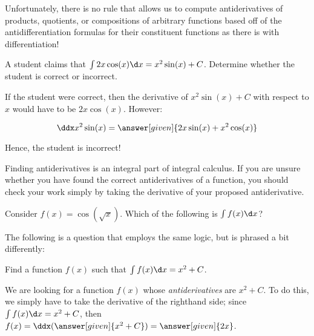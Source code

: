 \documentclass[nooutcomes]{ximera}
\begin{document}


Unfortunately, there is no rule that allows us to compute antiderivatives of products, quotients, or compositions of arbitrary functions based off of the antidifferentiation formulas for their constituent functions as there is with differentiation!  


\begin{example}
  A student claims that $\int 2x \cos(x) \d x = x^2 \sin(x) +C$.  Determine whether the student is correct or incorrect.
  
  \begin{explanation}
    If the student were correct, then the derivative of $x^2 \sin(x) +C$ with respect to $x$ would have to be $2x \cos(x)$.  However:
    
      \[\ddx x^2 \sin(x) = \answer[given]{2x \sin(x) +x^2 \cos(x)} \]
      
 Hence, the student is incorrect!
  \end{explanation}
\end{example}

\begin{remark}
Finding antiderivatives is an integral part of integral calculus.  If you are unsure whether you have found the correct antiderivatives of a function, you should check your work simply by taking the derivative of your proposed antiderivative.  
\end{remark}

\begin{question}
  Consider $f(x) = \cos(\sqrt{x})$. Which of the following is $\int f(x) \d x$?  
  \begin{selectAll}
  \end{selectAll}
\end{question}

The following is a question that employs the same logic, but is phrased a bit differently:

\begin{example}
  Find a function $f(x)$ such that $\int f(x) \d x = x^2 +C$.
  
  \begin{explanation}
    We are looking for a function $f(x)$ whose \emph{antiderivatives} are $x^2+C$.  To do this, we simply have to take the derivative of the righthand side; since $\int f(x) \d x =x^2+C$, then $f(x) = \ddx(\answer[given]{x^2+C}) =\answer[given]{2x}$.
    
    \end{explanation}
\end{example}
\end{document}
